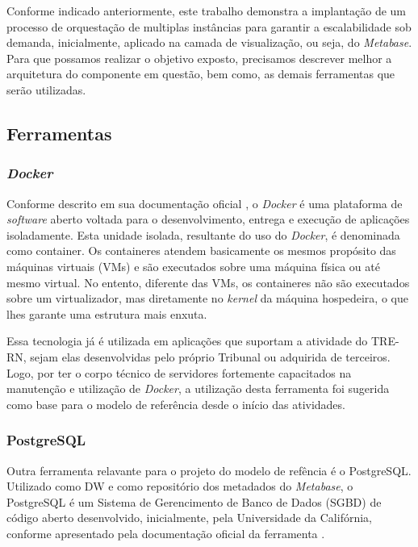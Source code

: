 Conforme indicado anteriormente, este trabalho demonstra a implantação de um processo de orquestação de multiplas instâncias para garantir a escalabilidade sob demanda, inicialmente, aplicado na camada de visualização, ou seja, do \textit{Metabase}. Para que possamos realizar o objetivo exposto, precisamos descrever melhor a arquitetura do componente em questão, bem como, as demais ferramentas que serão utilizadas. 

\subsection{Ferramentas}

\subsubsection{\textit{Docker}}

Conforme descrito em sua documentação oficial \cite{dockerDoc}, o \textit{Docker} é uma plataforma de \textit{software} aberto voltada para o desenvolvimento, entrega e execução de aplicações isoladamente. Esta unidade isolada, resultante do uso do \textit{Docker}, é denominada como container. Os containeres atendem basicamente os mesmos propósito das máquinas virtuais (VMs) e são executados sobre uma máquina física ou até mesmo virtual. No entento, diferente das VMs, os containeres não são executados sobre um virtualizador, mas diretamente no \textit{kernel} da máquina hospedeira, o que lhes garante uma estrutura mais enxuta.

Essa tecnologia já é utilizada em aplicações que suportam a atividade do TRE-RN, sejam elas desenvolvidas pelo próprio Tribunal ou adquirida de terceiros. Logo, por ter o corpo técnico de servidores fortemente capacitados na manutenção e utilização de \textit{Docker}, a utilização desta ferramenta foi sugerida como base para o modelo de referência desde o início das atividades.

\subsubsection{PostgreSQL}

Outra ferramenta relavante para o projeto do modelo de refência é o PostgreSQL. Utilizado como DW e como repositório dos metadados do \textit{Metabase}, o PostgreSQL é um Sistema de Gerencimento de Banco de Dados (SGBD) de código aberto desenvolvido, inicialmente, pela Universidade da Califórnia, conforme apresentado pela documentação oficial da ferramenta \cite{postgresDoc}.

